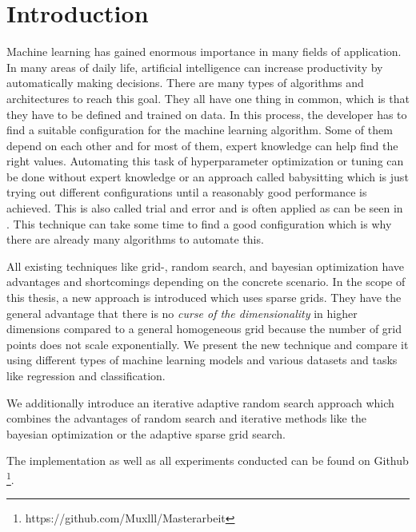 
\chapter{Introduction}\label{chapter:introduction}

Machine learning has gained enormous importance in many fields of application. In many areas of daily life, artificial intelligence can increase productivity by automatically making decisions. There are many types of algorithms and architectures to reach this goal. They all have one thing in common, which is that they have to be defined and trained on data. In this process, the developer has to find a suitable configuration for the machine learning algorithm. Some of them depend on each other and for most of them, expert knowledge can help find the right values. Automating this task of hyperparameter optimization or tuning can be done without expert knowledge or an approach called babysitting which is just trying out different configurations until a reasonably good performance is achieved. This is also called trial and error and is often applied as can be seen in \cite{MALAKOUTI2023200248, gorgolis2019hyperparameter}. This technique can take some time to find a good configuration which is why there are already many algorithms to automate this. \newline 

All existing techniques like grid-, random search, and bayesian optimization have advantages and shortcomings depending on the concrete scenario. In the scope of this thesis, a new approach is introduced which uses sparse grids. They have the general advantage that there is no \textit{curse of the dimensionality} in higher dimensions compared to a general homogeneous grid because the number of grid points does not scale exponentially. We present the new technique and compare it using different types of machine learning models and various datasets and tasks like regression and classification. 

We additionally introduce an iterative adaptive random search approach which combines the advantages of random search and iterative methods like the bayesian optimization or the adaptive sparse grid search. 

The implementation as well as all experiments conducted can be found on Github \footnote{https://github.com/Muxlll/Masterarbeit}. \newline 

